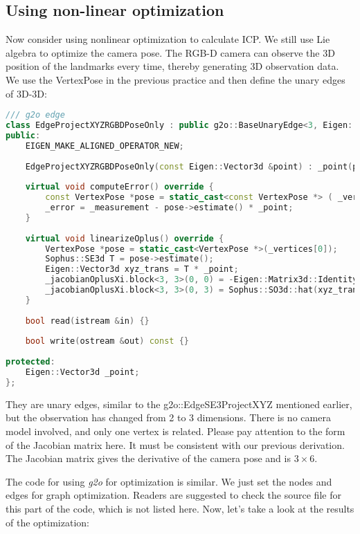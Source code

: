 \subsection{Using non-linear optimization}
Now consider using nonlinear optimization to calculate ICP. We still use Lie algebra to optimize the camera pose. The RGB-D camera can observe the 3D position of the landmarks every time, thereby generating 3D observation data. We use the VertexPose in the previous practice and then define the unary edges of 3D-3D:
\begin{lstlisting}[language=c++,caption=slambook2/ch7/pose\_estimation\_3d3d.cpp (part)]
/// g2o edge
class EdgeProjectXYZRGBDPoseOnly : public g2o::BaseUnaryEdge<3, Eigen::Vector3d, VertexPose> {
public:
	EIGEN_MAKE_ALIGNED_OPERATOR_NEW;
	
	EdgeProjectXYZRGBDPoseOnly(const Eigen::Vector3d &point) : _point(point) {}
	
	virtual void computeError() override {
		const VertexPose *pose = static_cast<const VertexPose *> ( _vertices[0] );
		_error = _measurement - pose->estimate() * _point;
	}
	
	virtual void linearizeOplus() override {
		VertexPose *pose = static_cast<VertexPose *>(_vertices[0]);
		Sophus::SE3d T = pose->estimate();
		Eigen::Vector3d xyz_trans = T * _point;
		_jacobianOplusXi.block<3, 3>(0, 0) = -Eigen::Matrix3d::Identity();
		_jacobianOplusXi.block<3, 3>(0, 3) = Sophus::SO3d::hat(xyz_trans);
	}
	
	bool read(istream &in) {}
	
	bool write(ostream &out) const {}
	
protected:
	Eigen::Vector3d _point;
};
\end{lstlisting}

They are unary edges, similar to the g2o::EdgeSE3ProjectXYZ mentioned earlier, but the observation has changed from 2 to 3 dimensions. There is no camera model involved, and only one vertex is related. Please pay attention to the form of the Jacobian matrix here. It must be consistent with our previous derivation. The Jacobian matrix gives the derivative of the camera pose and is $3 \times 6$.

The code for using \textit{g2o} for optimization is similar. We just set the nodes and edges for graph optimization. Readers are suggested to check the source file for this part of the code, which is not listed here. Now, let’s take a look at the results of the optimization:

